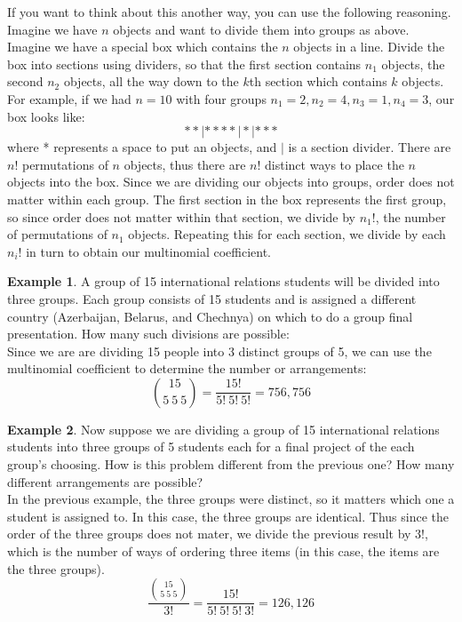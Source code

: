 \documentclass[12pt]{article}
\theoremstyle{definition}
\newtheorem*{example}{Example}
\theoremstyle{remark}
\begin{document}
If you want to think about this another way, you can use the following reasoning. Imagine we have $n$ objects and want to divide them into groups as above. Imagine we have a special box which contains the $n$ objects in a line. Divide the box into sections using dividers, so that the first section contains $n_1$ objects, the second $n_2$ objects, all the way down to the $k$th section which contains $k$ objects. For example, if we had $n = 10$ with four groups $n_1 = 2, n_2 = 4, n_3 = 1, n_4 = 3$, our box looks like:
\[
* * | * * * * | * | * * *
\]
where * represents a space to put an objects, and $|$ is a section divider. There are $n!$ permutations of $n$ objects, thus there are $n!$ distinct ways to place the $n$ objects into the box. Since we are dividing our objects into groups, order does not matter within each group. The first section in the box represents the first group, so since order does not matter within that section, we divide by $n_1!$, the number of permutations of $n_1$ objects. Repeating this for each section, we divide by each $n_i!$ in turn to obtain our multinomial coefficient. 

\begin{example}A group of 15 international relations students will be divided into three groups. Each group consists of 15 students and is assigned a different country (Azerbaijan, Belarus, and Chechnya) on which to do a group final presentation. How many such divisions are possible:\\

Since we are are dividing 15 people into 3 distinct groups of 5, we can use the multinomial coefficient to determine the number or arrangements:
\[
\binom{15}{5 \: 5\: 5} = \frac{15!}{5!\:5!\:5!} = 756,756
\]
\end{example}

\begin{example}Now suppose we are dividing a group of 15 international relations students into three groups of 5 students each for a final project of the each group's choosing. How is this problem different from the previous one? How many different arrangements are possible?\\

In the previous example, the three groups were distinct, so it matters which one a student is assigned to. In this case, the three groups are identical. Thus since the order of the three groups does not mater, we divide the previous result by $3!$, which is the number of ways of ordering three items (in this case, the items are the three groups).
\[
\frac{ \binom{15}{5 \: 5\: 5}}{3!} = \frac{15!}{5!\:5!\:5!\:3!} = 126,126
\]
\end{example}
\end{document}
